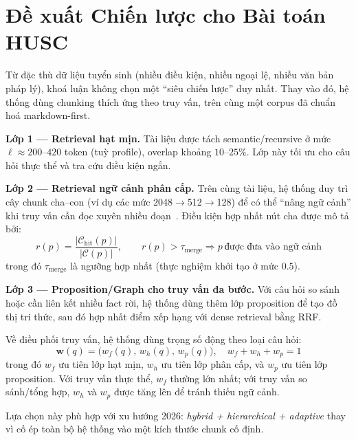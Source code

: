 \documentclass[12pt,a4paper]{report}
\theoremstyle{plain}
\theoremstyle{definition}
\begin{document}
	\section{Đề xuất Chiến lược cho Bài toán HUSC}
	\label{sec:recommendation}
	
	Từ đặc thù dữ liệu tuyển sinh (nhiều điều kiện, nhiều ngoại lệ, nhiều văn bản
	pháp lý), khoá luận không chọn một ``siêu chiến lược'' duy nhất. Thay vào đó,
	hệ thống dùng chunking thích ứng theo truy vấn, trên cùng một corpus đã chuẩn
	hoá markdown-first.
	
	\textbf{Lớp 1 --- Retrieval hạt mịn.} Tài liệu được tách semantic/recursive ở
	mức $\ell \approx 200$--$420$ token (tuỳ profile), overlap khoảng $10$--$25\%$.
	Lớp này tối ưu cho câu hỏi thực thể và tra cứu điều kiện ngắn.
	
	\textbf{Lớp 2 --- Retrieval ngữ cảnh phân cấp.} Trên cùng tài liệu, hệ thống
	duy trì cây chunk cha--con (ví dụ các mức 2048$\rightarrow$512$\rightarrow$128)
	để có thể ``nâng ngữ cảnh'' khi truy vấn cần đọc xuyên nhiều đoạn~\cite{llamaindex2026docs}.
	Điều kiện hợp nhất nút cha được mô tả bởi:
	\begin{equation}
		r(p)=\frac{|\mathcal{C}_{\text{hit}}(p)|}{|\mathcal{C}(p)|},
		\qquad
		r(p)>\tau_{\text{merge}} \Rightarrow p\ \text{được đưa vào ngữ cảnh}
		\label{eq:auto_merge_ratio}
	\end{equation}
	trong đó $\tau_{\text{merge}}$ là ngưỡng hợp nhất (thực nghiệm khởi tạo ở mức
	$0.5$).
	
	\textbf{Lớp 3 --- Proposition/Graph cho truy vấn đa bước.} Với câu hỏi so sánh
	hoặc cần liên kết nhiều fact rời, hệ thống dùng thêm lớp proposition để tạo
	đồ thị tri thức, sau đó hợp nhất điểm xếp hạng với dense retrieval bằng RRF.
	
	Về điều phối truy vấn, hệ thống dùng trọng số động theo loại câu hỏi:
	\begin{equation}
		\mathbf{w}(q) = \big(w_f(q),\, w_h(q),\, w_p(q)\big),
		\quad
		w_f+w_h+w_p=1
		\label{eq:adaptive_weight}
	\end{equation}
	trong đó $w_f$ ưu tiên lớp hạt mịn, $w_h$ ưu tiên lớp phân cấp, và $w_p$ ưu
	tiên lớp proposition. Với truy vấn thực thể, $w_f$ thường lớn nhất; với truy
	vấn so sánh/tổng hợp, $w_h$ và $w_p$ được tăng lên để tránh thiếu ngữ cảnh.
	
	Lựa chọn này phù hợp với xu hướng 2026: \emph{hybrid + hierarchical + adaptive}
	thay vì cố ép toàn bộ hệ thống vào một kích thước chunk cố định.
	
\end{document}

